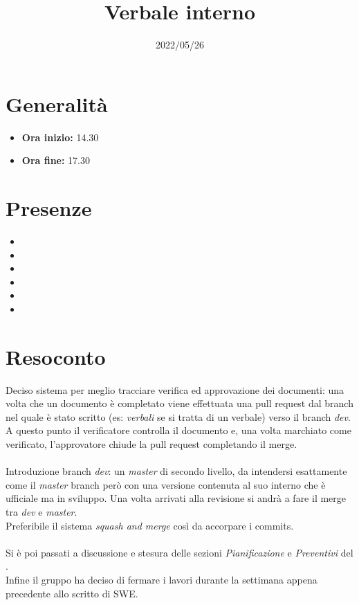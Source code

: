 \documentclass{classes/base}
\title{Verbale interno}
\date{2022/05/26}
\author{\marcob}
\renewcommand{\maketitle}{
    
}
\begin{document}
    \maketitle

    \section*{Generalità}
    \begin{itemize}
        \item \textbf{Ora inizio:} 14.30
        \item \textbf{Ora fine:} 17.30
    \end{itemize}

    \section*{Presenze}
    \begin{itemize}
     	\item \angela
    	\item \marcob
        \item \tommaso
        \item \matteo
        \item \marcov
        \item \giulio
    \end{itemize}

    \section*{Resoconto}
    Deciso sistema per meglio tracciare verifica ed approvazione dei documenti: una volta 
    che un documento è completato viene effettuata una pull request dal branch nel quale è stato
    scritto (es: \textit{verbali} se si tratta di un verbale) verso il branch \textit{dev}. \\
    A questo punto il verificatore controlla il documento e, una volta marchiato come verificato,
    l'approvatore chiude la pull request completando il merge.\\
    \\
    Introduzione branch \textit{dev}: un \textit{master} di secondo livello, da intendersi esattamente come il
    \textit{master} branch però con una versione contenuta al suo interno che è ufficiale ma in sviluppo.
    Una volta arrivati alla revisione si andrà a fare il merge tra \textit{dev} e \textit{master}.\\
    Preferibile il sistema \textit{squash and merge} così da accorpare i commits.\\
    \\
    Si è poi passati a discussione e stesura delle sezioni \textit{Pianificazione} e \textit{Preventivi}
    del \PdP.\\
    Infine il gruppo ha deciso di fermare i lavori durante la settimana appena precedente allo
    scritto di SWE.
\end{document}
